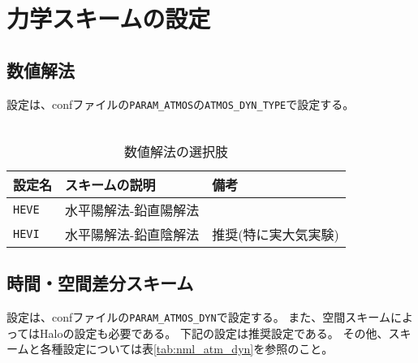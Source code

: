 \section{力学スキームの設定}
\label{sec:basic_dyn}


\subsection{数値解法}
設定は、confファイルの\verb|PARAM_ATMOS|の\verb|ATMOS_DYN_TYPE|で設定する。\\

\\

\begin{table}[h]
\begin{center}
  \caption{数値解法の選択肢}
  \label{tab:nml_dyn}
  \begin{tabularx}{150mm}{llX} \hline
    \rowcolor[gray]{0.9}  設定名 & スキームの説明 & 備考\\ \hline
      \verb|HEVE|  & 水平陽解法-鉛直陽解法 & \\
      \verb|HEVI|  & 水平陽解法-鉛直陰解法 & 推奨(特に実大気実験)\\
    \hline
  \end{tabularx}
\end{center}
\end{table}


\subsection{時間・空間差分スキーム}
設定は、confファイルの\verb|PARAM_ATMOS_DYN|で設定する。
また、空間スキームによってはHaloの設定も必要である。
下記の設定は推奨設定である。
その他、スキームと各種設定については表\ref{tab:nml_atm_dyn}を参照のこと。\\

